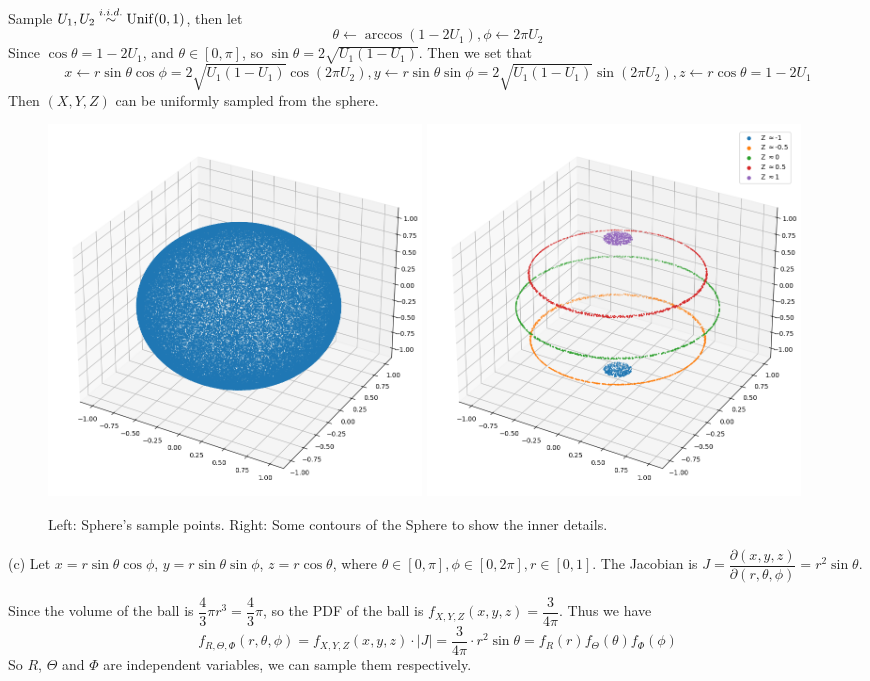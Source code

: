 \begin{homeworkProblem}
Sample $U_1, U_2\stackrel{i.i.d.}{\sim} \operatorname{Unif}(0, 1)$, then let
$$\theta\leftarrow \arccos(1-2U_1), \phi\leftarrow 2\pi U_2$$
Since $\cos\theta = 1 - 2U_1$, and $\theta\in [0, \pi]$, so $\sin\theta = 2\sqrt{U_1(1-U_1)}$. Then we set that
$$x\gets r\sin\theta\cos\phi = 2\sqrt{U_1(1-U_1)}\cos(2\pi U_2), y\gets r\sin\theta\sin\phi = 2\sqrt{U_1(1-U_1)}\sin(2\pi U_2), z\gets r\cos\theta = 1-2U_1$$
Then $(X, Y, Z)$ can be uniformly sampled from the sphere.

\begin{figure}[ht]
    \centering
    \includegraphics[width=0.48\textwidth]{./figure/p7/b_sample.png}
    \includegraphics[width=0.48\textwidth]{./figure/p7/b_contour.png}
    \caption{Left: Sphere's sample points. Right: Some contours of the Sphere to show the inner details.}
\end{figure}


(c) Let $x=r\sin\theta\cos\phi$, $y=r\sin\theta\sin\phi$, $z=r\cos\theta$, where $\theta\in [0, \pi], \phi\in [0, 2\pi], r\in [0, 1]$. The Jacobian is $J=\dfrac{\partial(x, y, z)}{\partial(r, \theta, \phi)}=r^2\sin\theta$.

Since the volume of the ball is $\dfrac{4}{3}\pi r^3=\dfrac{4}{3}\pi$, so the PDF of the ball is $f_{X, Y, Z}(x, y, z)=\dfrac{3}{4\pi}$. Thus we have
$$f_{R, \Theta, \Phi}(r, \theta, \phi)=f_{X, Y, Z}(x, y, z)\cdot|J|=\dfrac{3}{4\pi}\cdot r^2\sin\theta=f_R(r)f_{\Theta}(\theta)f_{\Phi}(\phi)$$
So $R$, $\Theta$ and $\Phi$ are independent variables, we can sample them respectively.


\end{homeworkProblem}
